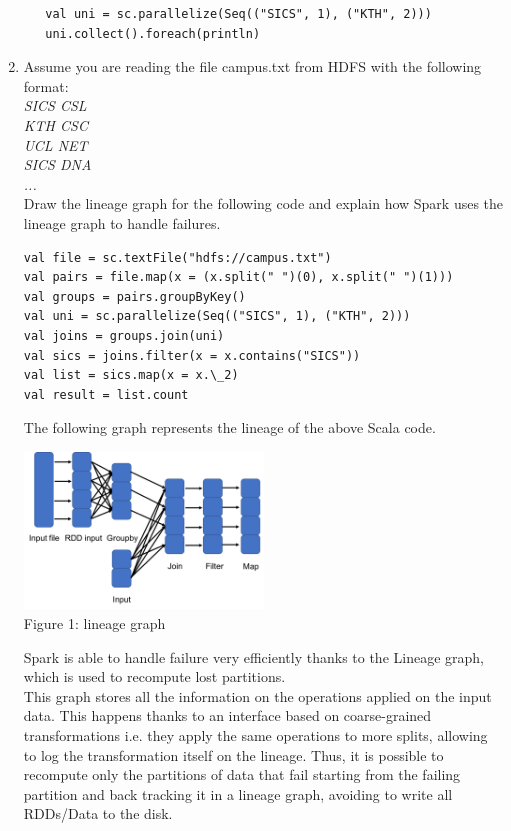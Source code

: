 \documentclass[]{report}
\begin{document}
\begin{enumerate}
 \begin{verbatim}
   val uni = sc.parallelize(Seq(("SICS", 1), ("KTH", 2)))
   uni.collect().foreach(println)
 \end{verbatim}
 

 
 \item Assume you are reading the file campus.txt from HDFS with the following format:\\
\textit{  SICS CSL\\
  KTH CSC\\
  UCL NET\\
  SICS DNA\\
  ...\\}
Draw the lineage graph for the following code and explain how Spark uses the lineage graph to handle failures.
\begin{verbatim}
val file = sc.textFile("hdfs://campus.txt") 
val pairs = file.map(x = (x.split(" ")(0), x.split(" ")(1))) 
val groups = pairs.groupByKey()
val uni = sc.parallelize(Seq(("SICS", 1), ("KTH", 2)))
val joins = groups.join(uni)
val sics = joins.filter(x = x.contains("SICS"))
val list = sics.map(x = x.\_2)
val result = list.count
\end{verbatim}

The following graph represents the lineage of the above Scala code.
\begin{center}
  \includegraphics[width=0.5\textwidth]{Lineage.png}\\
  Figure 1: lineage graph
\end{center}

Spark is able to handle failure very efficiently thanks to the Lineage graph, which is used to recompute lost partitions.\\ This graph stores all the information on the operations applied on the input data. This happens thanks to an interface based on coarse-grained transformations i.e. they apply the same operations to more splits, allowing to log the transformation itself on the lineage. 
Thus, it is possible to recompute only the partitions of data that fail starting from the failing partition and back tracking it in a lineage graph, avoiding to write all RDDs/Data to the disk. 
\end{enumerate}
\end{document}
